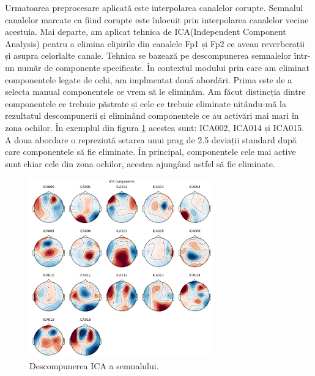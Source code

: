 Urmatoarea preprocesare aplicată este interpolarea canalelor corupte. Semnalul canalelor marcate ca fiind corupte este înlocuit prin interpolarea canalelor vecine acestuia. Mai departe, am aplicat tehnica de ICA(Independent Component Analysis) pentru a elimina clipirile din canalele Fp1 și Fp2 ce aveau reverberații și asupra celorlalte canale. Tehnica se bazează pe descompunerea semnalelor într-un număr de componente specificate. În contextul modului prin care am eliminat componentele legate de ochi, am implmentat două abordări. Prima este de a selecta manual componentele ce vrem să le eliminăm. Am făcut distincția dintre componentele ce trebuie păstrate și cele ce trebuie eliminate uitându-mă la rezultatul descompunerii și eliminând componentele ce au activări mai mari în zona ochilor. În exemplul din figura \ref{fig:descompunere_ica} acestea sunt: ICA002, ICA014 și ICA015. A doua abordare o reprezintă setarea unui prag de 2.5 deviații standard după care componentele să fie eliminate. În principal, componentele cele mai active sunt chiar cele din zona ochilor, acestea ajungând astfel să fie eliminate.
\begin{figure}[H]
    \centering
		\vspace{-1em}
    \includegraphics[width=8cm]{images/ica_components.png}
    \caption{Descompunerea ICA a semnalului.}
		\vspace{-1em}
    \label{fig:descompunere_ica}
\end{figure}

